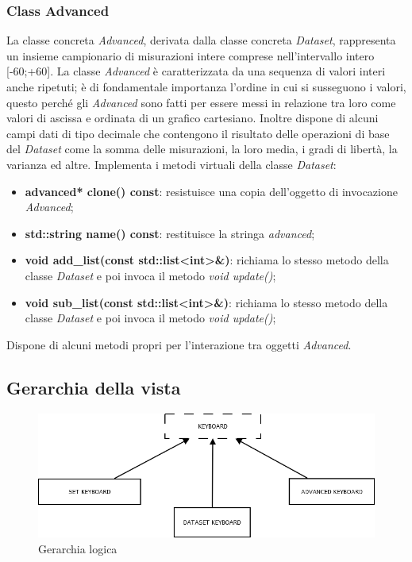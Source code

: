 \documentclass[a4paper,10pt]{article}
\begin{document}
        \subsubsection{Class Advanced}
        La classe concreta \textit{Advanced}, derivata dalla classe concreta \textit{Dataset}, rappresenta un insieme campionario di misurazioni intere comprese nell’intervallo intero [-60;+60]. La classe \textit{Advanced} è caratterizzata da una sequenza di valori interi anche ripetuti; è di fondamentale importanza l’ordine in cui si susseguono i valori, questo perché gli \textit{Advanced} sono fatti per essere messi in relazione tra loro come valori di ascissa e ordinata di un grafico cartesiano. Inoltre dispone di alcuni campi dati di tipo decimale che contengono il risultato delle operazioni di base del \textit{Dataset} come la somma delle misurazioni, la loro media, i gradi di libertà, la varianza ed altre.
        Implementa i metodi virtuali della classe \textit{Dataset}:
        \begin{itemize}
            \item \textbf{advanced* clone() const}: resistuisce una copia dell'oggetto di invocazione \textit{Advanced};
            \item \textbf{std::string name() const}: restituisce la stringa \textit{advanced};
            \item \textbf{void add\_list(const std::list<int>\&)}: richiama lo stesso metodo della classe \textit{Dataset} e poi invoca il metodo \textit{void update()};
            \item \textbf{void sub\_list(const std::list<int>\&)}: richiama lo stesso metodo della classe \textit{Dataset} e poi invoca il metodo \textit{void update()};
        \end{itemize}
        Dispone di alcuni metodi propri per l'interazione tra oggetti \textit{Advanced}.
    
        \newpage
        \subsection{Gerarchia della vista}
        \begin{figure}[!h]
            \begin{center} \includegraphics[scale=0.5]{img/Diagramma2.png}
                \caption{Gerarchia logica}
            \end{center}
        \end{figure}
\end{document}
